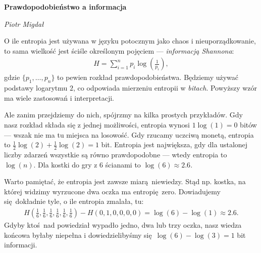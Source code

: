 \documentclass[10pt,a4paper]{article}
\begin{document}
\noindent\textbf{\LARGE Prawdopodobieństwo a informacja}

\medskip
\noindent\textit{\Large Piotr Migdał}

\medskip

O ile entropia jest używana w języku potocznym jako chaos i nieuporządkowanie, to sama wielkość jest ściśle określonym pojęciem --- \emph{informacją Shannona}:
%
%
\begin{align}
    H = \sum_{i=1}^{n} p_i \log \left(\tfrac{1}{p_i} \right),\label{eq:entropia}
\end{align}
%
%
gdzie $\{p_1, \ldots, p_n\}$ to pewien rozkład prawdopodobieństwa.
Będziemy używać podstawy logarytmu $2$, co odpowiada mierzeniu entropii w \emph{bitach}.
Powyższy wzór ma wiele zastosowań i interpretacji.

Ale zanim przejdziemy do nich, spójrzmy na kilka prostych przykładów.
Gdy nasz rozkład składa się z jednej możliwości, entropia wynosi $1 \log(1) = 0$ bitów --- wszak nie ma tu miejsca na losowość.
Gdy rzucamy uczciwą monetą, entropia to $\tfrac{1}{2} \log(2) + \tfrac{1}{2} \log(2) = 1$ bit.
Entropia jest największa, gdy dla ustalonej liczby zdarzeń wszystkie są równo prawdopodobne --- wtedy entropia to $\log(n)$.
Dla kostki do gry z $6$ ścianami to $\log(6)\approx 2.6$.

Warto pamiętać, że entropia jest zawsze miarą niewiedzy.
Stąd np. kostka, na której widzimy wyrzucone dwa oczka ma entropię zero.
Dowiadujemy się dokładnie tyle, o ile entropia zmalała, tu:
%
\begin{align}
    H(\tfrac{1}{6}, \tfrac{1}{6}, \tfrac{1}{6}, \tfrac{1}{6}, \tfrac{1}{6}, \tfrac{1}{6})
    - H(0, 1, 0, 0, 0, 0) = \log(6) - \log(1)
    \approx 2.6.
\end{align}
%
Gdyby ktoś nad powiedział wypadło jedno, dwa lub trzy oczka, nasz wiedza końcowa byłaby niepełna i dowiedzielibyśmy się $\log(6) - \log(3) = 1 $ bit informacji.


\end{document}
